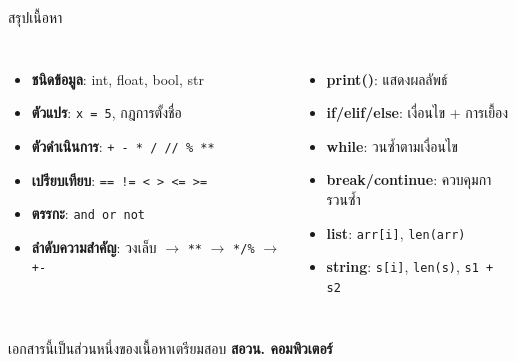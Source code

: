 \documentclass[11pt, aspectratio=169]{beamer}
\newcommand{\py}[1]{\texttt{#1}}
\begin{document}
\begin{frame}{สรุปเนื้อหา}
  \begin{explanation}[สิ่งที่ได้เรียนรู้]
    \begin{columns}[T]
        \begin{itemize}
          \item \textbf{ชนิดข้อมูล}: int, float, bool, str
          \item \textbf{ตัวแปร}: \py{x = 5}, กฎการตั้งชื่อ
          \item \textbf{ตัวดำเนินการ}: \py{+ - * / // \% **}
          \item \textbf{เปรียบเทียบ}: \py{== != < > <= >=}
          \item \textbf{ตรรกะ}: \py{and or not}
          \item \textbf{ลำดับความสำคัญ}: วงเล็บ $\to$ \py{**} $\to$ \py{*/\%} $\to$ \py{+-}
        \end{itemize}
        \begin{itemize}
          \item \textbf{print()}: แสดงผลลัพธ์
          \item \textbf{if/elif/else}: เงื่อนไข + การเยื้อง
          \item \textbf{while}: วนซํ้าตามเงื่อนไข
          \item \textbf{break/continue}: ควบคุมการวนซํ้า
          \item \textbf{list}: \py{arr[i]}, \py{len(arr)}
          \item \textbf{string}: \py{s[i]}, \py{len(s)}, \py{s1 + s2}
        \end{itemize}
    \end{columns}
  \end{explanation}
  \begin{center}
    \large เอกสารนี้เป็นส่วนหนึ่งของเนื้อหาเตรียมสอบ \textbf{สอวน. คอมพิวเตอร์}
  \end{center}
\end{frame}
\end{document}
